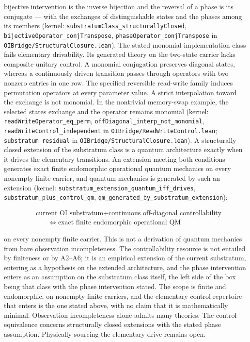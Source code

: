 \documentclass[
]{article}
\begin{document}
bijective intervention is the inverse bijection and the reversal of a
phase is its conjugate --- with the exchanges of distinguishable states
and the phases among its members (kernel:
\texttt{substratumClass\_structurallyClosed},
\texttt{bijectiveOperator\_conjTranspose},
\texttt{phaseOperator\_conjTranspose} in
\texttt{OIBridge/StructuralClosure.lean}). The stated monomial
implementation class fails elementary drivability. Its generated theory
on the two-state carrier lacks composite unitary control. A monomial
conjugation preserves diagonal states, whereas a continuously driven
transition passes through operators with two nonzero entries in one row.
The specified reversible read-write family induces permutation operators
at every parameter value. A strict interpolation toward the exchange is
not monomial. In the nontrivial memory-swap example, the selected states
exchange and the operator remains monomial (kernel:
\texttt{readWriteOperator\_eq\_perm},
\texttt{offDiagonal\_interp\_not\_monomial},
\texttt{readWriteControl\_independent} in
\texttt{OIBridge/ReadWriteControl.lean}; \texttt{substratum\_residual}
in \texttt{OIBridge/StructuralClosure.lean}). A structurally closed
extension of the substratum class is a quantum architecture exactly when
it drives the elementary transitions. An extension meeting both
conditions generates exact finite endomorphic operational quantum
mechanics on every nonempty finite carrier, and quantum mechanics is
generated by such an extension (kernel:
\texttt{substratum\_extension\_quantum\_iff\_drives},
\texttt{substratum\_plus\_control\_qm},
\texttt{qm\_generated\_by\_substratum\_extension}):

\[\boxed{\begin{aligned}&\text{current OI substratum} + \text{continuous off-diagonal controllability}\\ &\qquad \iff\; \text{exact finite endomorphic operational QM}\end{aligned}}\]

on every nonempty finite carrier. This is not a derivation of quantum
mechanics from bare observation incompleteness. The controllability
resource is not entailed by finiteness or by A2--A6; it is an empirical
extension of the current substratum, entering as a hypothesis on the
extended architecture, and the phase intervention enters as an
assumption on the substratum class itself, the left side of the box
being that class with the phase intervention stated. The scope is finite
and endomorphic, on nonempty finite carriers, and the elementary control
repertoire that enters is the one stated above, with no claim that it is
mathematically minimal. Observation incompleteness alone admits many
theories. The control equivalence concerns structurally closed
extensions with the stated phase assumption. Physically sourcing the
elementary drive remains open.
\end{document}
